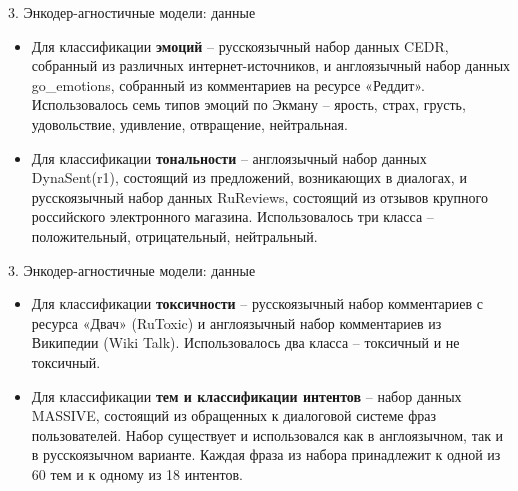 \begin{frame}{3. Энкодер-агностичные модели: данные}
\begin{itemize}
    \item Для классификации \textbf{эмоций} -- русскоязычный набор данных CEDR, собранный из различных интернет-источников, и англоязычный набор данных go\_emotions, собранный из комментариев на ресурсе «Реддит». Использовалось семь типов эмоций по Экману -- ярость, страх, грусть, удовольствие, удивление, отвращение, нейтральная.
    \item Для классификации \textbf{тональности} -- англоязычный набор данных DynaSent(r1), состоящий из предложений, возникающих в диалогах, и русскоязычный набор данных RuReviews, состоящий из отзывов крупного российского электронного магазина. Использовалось три класса -- положительный, отрицательный, нейтральный.
\end{itemize}
\end{frame}

\begin{frame}{3. Энкодер-агностичные модели: данные}
\begin{itemize}
    \item Для классификации \textbf{токсичности} -- русскоязычный набор комментариев с ресурса «Двач» (RuToxic) и англоязычный набор комментариев из Википедии (Wiki Talk). Использовалось два класса -- токсичный и не токсичный.
    \item Для классификации \textbf{тем и классификации интентов} -- набор данных MASSIVE, состоящий из обращенных к диалоговой системе фраз пользователей. Набор существует и использовался как в англоязычном, так и в русскоязычном варианте. Каждая фраза из набора принадлежит к одной из 60 тем и к одному из 18 интентов.
\end{itemize}
\end{frame}

